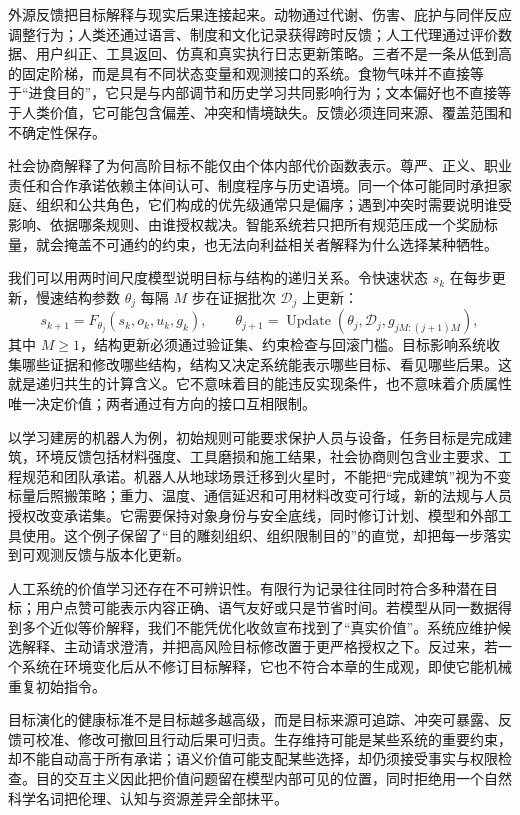 外源反馈把目标解释与现实后果连接起来。动物通过代谢、伤害、庇护与同伴反应调整行为；人类还通过语言、制度和文化记录获得跨时反馈；人工代理通过评价数据、用户纠正、工具返回、仿真和真实执行日志更新策略。三者不是一条从低到高的固定阶梯，而是具有不同状态变量和观测接口的系统。食物气味并不直接等于“进食目的”，它只是与内部调节和历史学习共同影响行为；文本偏好也不直接等于人类价值，它可能包含偏差、冲突和情境缺失。反馈必须连同来源、覆盖范围和不确定性保存。

社会协商解释了为何高阶目标不能仅由个体内部代价函数表示。尊严、正义、职业责任和合作承诺依赖主体间认可、制度程序与历史语境。同一个体可能同时承担家庭、组织和公共角色，它们构成的优先级通常只是偏序；遇到冲突时需要说明谁受影响、依据哪条规则、由谁授权裁决。智能系统若只把所有规范压成一个奖励标量，就会掩盖不可通约的约束，也无法向利益相关者解释为什么选择某种牺牲。

我们可以用两时间尺度模型说明目标与结构的递归关系。令快速状态 $s_k$ 在每步更新，慢速结构参数 $\theta_j$ 每隔 $M$ 步在证据批次 $\mathcal D_j$ 上更新：
\begin{equation}
  s_{k+1}=F_{\theta_j}(s_k,o_k,u_k,g_k),\qquad
  \theta_{j+1}=\operatorname{Update}
  (\theta_j,\mathcal D_j,g_{jM:(j+1)M}),
\end{equation}
其中 $M\ge1$，结构更新必须通过验证集、约束检查与回滚门槛。目标影响系统收集哪些证据和修改哪些结构，结构又决定系统能表示哪些目标、看见哪些后果。这就是递归共生的计算含义。它不意味着目的能违反实现条件，也不意味着介质属性唯一决定价值；两者通过有方向的接口互相限制。

以学习建房的机器人为例，初始规则可能要求保护人员与设备，任务目标是完成建筑，环境反馈包括材料强度、工具磨损和施工结果，社会协商则包含业主要求、工程规范和团队承诺。机器人从地球场景迁移到火星时，不能把“完成建筑”视为不变标量后照搬策略；重力、温度、通信延迟和可用材料改变可行域，新的法规与人员授权改变承诺集。它需要保持对象身份与安全底线，同时修订计划、模型和外部工具使用。这个例子保留了“目的雕刻组织、组织限制目的”的直觉，却把每一步落实到可观测反馈与版本化更新。

人工系统的价值学习还存在不可辨识性。有限行为记录往往同时符合多种潜在目标；用户点赞可能表示内容正确、语气友好或只是节省时间。若模型从同一数据得到多个近似等价解释，我们不能凭优化收敛宣布找到了“真实价值”。系统应维护候选解释、主动请求澄清，并把高风险目标修改置于更严格授权之下。反过来，若一个系统在环境变化后从不修订目标解释，它也不符合本章的生成观，即使它能机械重复初始指令。

目标演化的健康标准不是目标越多越高级，而是目标来源可追踪、冲突可暴露、反馈可校准、修改可撤回且行动后果可归责。生存维持可能是某些系统的重要约束，却不能自动高于所有承诺；语义价值可能支配某些选择，却仍须接受事实与权限检查。目的交互主义因此把价值问题留在模型内部可见的位置，同时拒绝用一个自然科学名词把伦理、认知与资源差异全部抹平。

